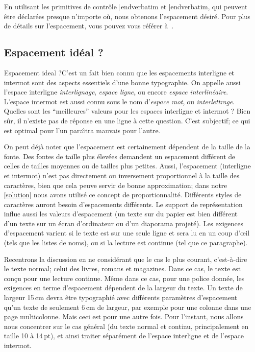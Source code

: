 En utilisant les primitives de contr\^ole {\color{brown}\verbatim \spaceskip|endverbatim} et {\color{brown}\verbatim \baselineskip|endverbatim}, qui peuvent \^etre d\'eclar\'ees presque n'importe o\`u, nous obtenons l'espacement d\'esir\'e. Pour plus de d\'etails sur l'espacement, vous pouvez vous r\'ef\'erer \`a~\cite{knuth_texbook}.


\subsection{Espacement id\'eal ?}{Espacement ideal ?}C'est un fait bien connu que les espacements interligne et intermot sont des aspects essentiels d'une bonne typographie. On appelle aussi l'espace interligne {\sl interlignage}, {\sl espace ligne}, ou encore {\sl espace interlin\'eaire}. L'espace intermot est aussi connu sous le nom d'{\sl espace mot}, ou {\sl interlettrage}. Quelles sont les ``meilleures'' valeurs pour les espaces interligne et intermot ? Bien s\^ur, il n'existe pas de r\'eponse en une ligne \`a cette question. C'est subjectif; ce qui est optimal pour l'un para\^\i tra mauvais pour l'autre.

On peut d\'ej\`a noter que l'espacement est certainement d\'ependent de la taille de la fonte. Des fontes de taille plus \'elev\'ees demandent un espacement diff\'erent de celles de tailles moyennes ou de tailles plus petites. Aussi, l'espacement (interligne et intermot) n'est pas directement ou inversement proportionnel \`a la taille des caract\`eres, bien que cela peuve servir de bonne approximation; dans notre \ref{solution} nous avons utilis\'e ce concept de proportionnalit\'e. Diff\'erents styles de caract\`eres auront besoin d'espacements diff\'erents. Le support de repr\'esentation influe aussi les valeurs d'espacement (un texte sur du papier est bien diff\'erent d'un texte sur un \'ecran d'ordinateur ou d'un diaporama projet\'e).  Les exigences d'espacement varient si le texte est sur une seule ligne et sera lu en un coup d'\oe il (tels que les listes de noms), ou si la lecture est continue (tel que ce paragraphe).

Recentrons la discussion en ne consid\'erant que le cas le plus courant, c'est-\`a-dire le texte normal; celui des livres, romans et magazines. Dans ce cas, le texte est con\c cu pour une lecture continue. M\^eme dans ce cas, pour une police donn\'ee, les exigences en terme d'espacement d\'ependent de la largeur du texte. Un texte de largeur 15\,cm devra \^etre typographi\'e avec diff\'erents param\`etres d'espacement qu'un texte de seulement 6\,cm de largeur, par exemple pour une colonne dans une page multicolonne. Mais ceci est pour une autre fois. Pour l'instant, nous allons nous concentrer sur le cas g\'en\'eral (du texte normal et continu, principalement en taille 10 \`a 14\,pt), et ainsi traiter s\'epar\'ement de l'espace interligne et de l'espace intermot.

